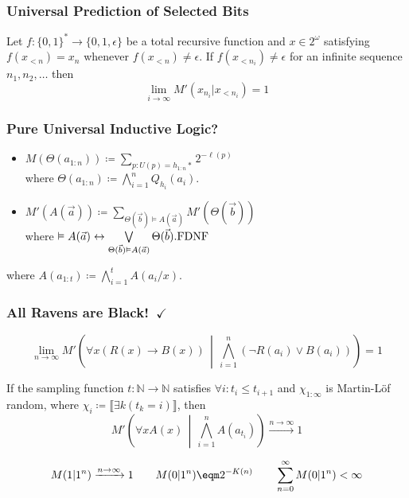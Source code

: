 \documentclass[UTF8,11pt,colorlinks,compress,openany]{beamer}%
\begin{document}
\begin{frame}\frametitle{Universal Prediction of Selected Bits}
	\begin{theorem}
		Let $f:\{0,1\}^*\to\{0,1,\epsilon\}$ be a total recursive function and $x\in 2^\omega$ satisfying $f(x_{<n})=x_n$ whenever $f(x_{<n})\neq\epsilon$. If $f(x_{<n_i})\neq\epsilon$ for an infinite sequence $n_1,n_2,\dots$ then
		\[\lim\limits_{i\to\infty}M'(x_{n_i}|x_{<n_i})=1\]
	\end{theorem}
\end{frame}

\begin{frame}\frametitle{Pure Universal Inductive Logic?}
\setlength\abovedisplayskip{0pt}
\setlength\belowdisplayskip{0pt}
\begin{block}{}
\begin{itemize}
\item $M(\Theta(a_{1:n}))\coloneqq \sum\limits_{p:U(p)=h_{1:n}*}2^{-\ell(p)}$\\
where $\Theta(a_{1:n})\coloneqq \bigwedge\limits_{i=1}^n Q_{h_i}(a_i)$.
\item $M'\left(A(\vec{a})\right)\coloneqq \sum\limits_{\Theta(\vec{b})\vDash A(\vec{a})} M'(\Theta(\vec{b}))$\\
where
$\vDash A(\vec{a})\leftrightarrow\bigvee\limits_{\Theta(\vec{b}) \vDash A(\vec{a})}\Theta(\vec{b}). \hfill\text{FDNF}$
\end{itemize}
\end{block}
\centerline{}
where $A(a_{1:t})\coloneqq \bigwedge\limits_{i=1}^t A(a_i/x)$.
\end{frame}

\begin{frame}\frametitle{All Ravens are Black!~$\checkmark$}
	\begin{theorem}
		\[\lim\limits_{n\to\infty} M'\left(\forall x(R(x)\to B(x))\,\middle|\,\bigwedge\limits_{i=1}^n (\neg R(a_i)\vee B(a_i))\right)=1\]
	\end{theorem}
	\begin{theorem}
		If the sampling function $t:\mathbb{N}\to\mathbb{N}$ satisfies $\forall i: t_i\leq t_{i+1}$ and $\chi_{1:\infty}$ is Martin-L\"of random, where $\chi_i\coloneqq \llbracket\exists k(t_k=i)\rrbracket$, then
		\[M'\left(\forall x A(x)\,\middle|\,\bigwedge\limits_{i=1}^n A(a_{t_i})\right)\xrightarrow{n\to\infty}1\]
	\end{theorem}
	\[M(1|1^n)\xrightarrow{n\to\infty}1\qquad M(0|1^n)\eqm 2^{-K(n)}\qquad\sum\limits_{n=0}^\infty M(0|1^n)<\infty\]
\end{frame}
\end{document}
